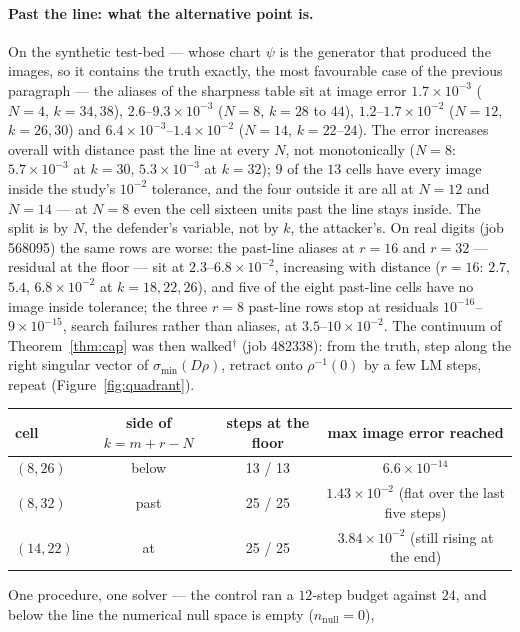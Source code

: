 \paragraph{Past the line: what the alternative point is.} On the synthetic
test-bed — whose chart $\psi$ is the generator that produced the images, so
it contains the truth exactly, the most favourable case of the previous
paragraph — the aliases of the sharpness table sit at image error
$1.7\times10^{-3}$ ($N=4$, $k=34,38$), $2.6$--$9.3\times10^{-3}$ ($N=8$,
$k=28$ to $44$), $1.2$--$1.7\times10^{-2}$ ($N=12$, $k=26,30$) and
$6.4\times10^{-3}$--$1.4\times10^{-2}$ ($N=14$, $k=22$--$24$). The error
increases overall with distance past the line at every $N$, not
monotonically ($N=8$: $5.7\times10^{-3}$ at $k=30$, $5.3\times10^{-3}$ at
$k=32$); $9$ of the $13$ cells have every image inside the study's $10^{-2}$
tolerance, and the four outside it are all at $N=12$ and $N=14$ — at $N=8$
even the cell sixteen units past the line stays inside. The split is by
$N$, the defender's variable, not by $k$, the attacker's. On real digits
(job 568095) the same rows are worse: the past-line aliases at $r=16$ and
$r=32$ — residual at the floor — sit at $2.3$--$6.8\times10^{-2}$,
increasing with distance ($r=16$: $2.7$, $5.4$, $6.8\times10^{-2}$ at
$k=18,22,26$), and five of the eight past-line cells have no image inside
tolerance; the three $r=8$ past-line rows stop at residuals
$10^{-16}$--$9\times10^{-15}$, search failures rather than aliases, at
$3.5$--$10\times10^{-2}$. The continuum of
Theorem~\ref{thm:cap} was then walked$^\dagger$ (job 482338): from the truth,
step along the right singular vector of $\sigma_{\min}(D\rho)$, retract onto
$\rho^{-1}(0)$ by a few LM steps, repeat (Figure~\ref{fig:quadrant}).
\begin{center}\small
\begin{tabular}{@{}lccc@{}}\toprule
cell & side of $k=m+r-N$ & steps at the floor & max image error reached\\ \midrule
$(8,26)$ & below & 13 / 13 & $6.6\times10^{-14}$\\
$(8,32)$ & past & 25 / 25 & $1.43\times10^{-2}$ (flat over the last five steps)\\
$(14,22)$ & at & 25 / 25 & $3.84\times10^{-2}$ (still rising at the end)\\ \bottomrule
\end{tabular}
\end{center}
One procedure, one solver — the control ran a $12$-step budget against
$24$, and below the line the numerical null space is empty ($n_{\mathrm{null}}=0$),
